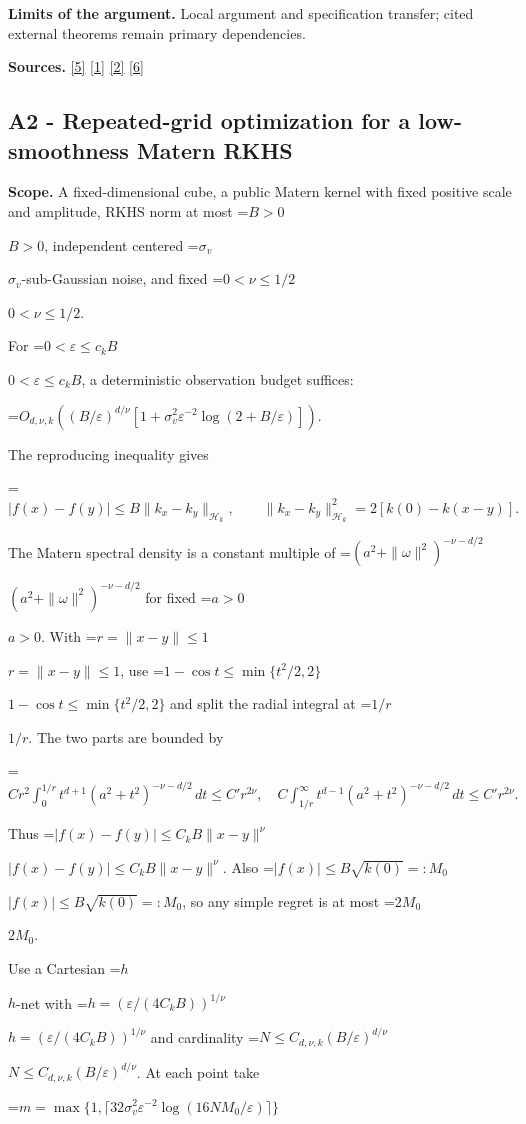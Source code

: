 \documentclass[10pt,a4paper]{article}
\newcommand{\AtlasMath}[1]{\par\begingroup\centering\setbox0=\hbox{$\displaystyle #1$}\ifdim\wd0>1.4\linewidth\typeout{ATLAS WIDE FORMULA: \the\wd0}\fi\ifdim\wd0>\linewidth\resizebox{\linewidth}{!}{\box0}\else\box0\fi\par\endgroup}
\newcommand{\AtlasInlineMath}[1]{\begingroup\setbox0=\hbox{$#1$}\ifdim\wd0>.4\linewidth\endgroup\AtlasMath{#1}\else\endgroup$#1$\fi}
\begin{document}
\textbf{Limits of the argument.} Local argument and specification transfer; cited external theorems remain primary dependencies.

\textbf{Sources.} \href{https://proceedings.neurips.cc/paper/2021/file/b1300291698eadedb559786c809cc592-Paper.pdf}{[5]} \href{https://arxiv.org/html/2602.17940v1}{[1]} \href{https://arxiv.org/html/2502.06363v1}{[2]} \href{https://arxiv.org/html/2607.29245v2}{[6]}

\subsection{A2 - Repeated-grid optimization for a low-smoothness Matern RKHS}
\textbf{Scope.} A fixed-dimensional cube, a public Matern kernel with fixed positive scale and amplitude, RKHS norm at most \AtlasInlineMath{B>0}, independent centered \AtlasInlineMath{\sigma_v}-sub-Gaussian noise, and fixed \AtlasInlineMath{0<\nu\le1/2}.

For \AtlasInlineMath{0<\varepsilon\le c_kB}, a deterministic observation budget suffices:

\AtlasMath{O_{d,\nu,k}\!\left((B/\varepsilon)^{d/\nu}[1+\sigma_v^2\varepsilon^{-2}\log(2+B/\varepsilon)]\right).}


The reproducing inequality gives

\AtlasMath{|f(x)-f(y)|\le B\|k_x-k_y\|_{\mathcal H_k},\qquad\|k_x-k_y\|_{\mathcal H_k}^2=2[k(0)-k(x-y)].}

The Matern spectral density is a constant multiple of \AtlasInlineMath{(a^2+\|\omega\|^2)^{-\nu-d/2}} for fixed \AtlasInlineMath{a>0}. With \AtlasInlineMath{r=\|x-y\|\le1}, use \AtlasInlineMath{1-\cos t\le\min\{t^2/2,2\}} and split the radial integral at \AtlasInlineMath{1/r}. The two parts are bounded by

\AtlasMath{Cr^2\int_0^{1/r}t^{d+1}(a^2+t^2)^{-\nu-d/2}\,dt\le C'r^{2\nu},\quad C\int_{1/r}^{\infty}t^{d-1}(a^2+t^2)^{-\nu-d/2}\,dt\le C'r^{2\nu}.}

Thus \AtlasInlineMath{|f(x)-f(y)|\le C_kB\|x-y\|^\nu}. Also \AtlasInlineMath{|f(x)|\le B\sqrt{k(0)}=:M_0}, so any simple regret is at most \AtlasInlineMath{2M_0}.

Use a Cartesian \AtlasInlineMath{h}-net with \AtlasInlineMath{h=(\varepsilon/(4C_kB))^{1/\nu}} and cardinality \AtlasInlineMath{N\le C_{d,\nu,k}(B/\varepsilon)^{d/\nu}}. At each point take

\AtlasMath{m=\max\{1,\lceil32\sigma_v^2\varepsilon^{-2}\log(16NM_0/\varepsilon)\rceil\}}
\end{document}
